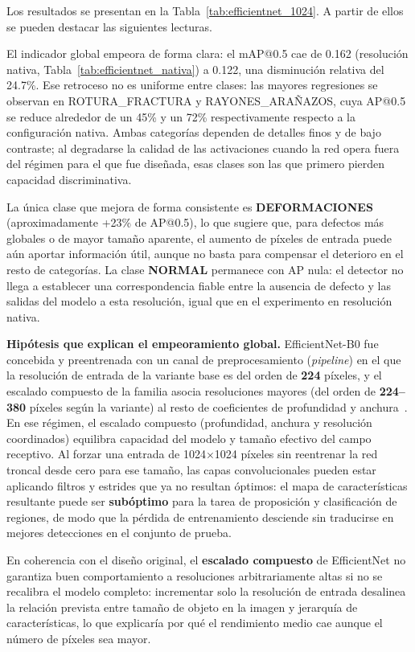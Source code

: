 Los resultados se presentan en la Tabla~\ref{tab:efficientnet_1024}. A partir de ellos se pueden destacar las siguientes lecturas.

El indicador global empeora de forma clara: el mAP@0.5 cae de 0.162 (resolución nativa, Tabla~\ref{tab:efficientnet_nativa}) a 0.122, una disminución relativa del 24.7\%. Ese retroceso no es uniforme entre clases: las mayores regresiones se observan en \mbox{ROTURA\_FRACTURA} y \mbox{RAYONES\_ARAÑAZOS}, cuya AP@0.5 se reduce alrededor de un 45\% y un 72\% respectivamente respecto a la configuración nativa. Ambas categorías dependen de detalles finos y de bajo contraste; al degradarse la calidad de las activaciones cuando la red opera fuera del régimen para el que fue diseñada, esas clases son las que primero pierden capacidad discriminativa.

La única clase que mejora de forma consistente es \textbf{DEFORMACIONES} (aproximadamente +23\% de AP@0.5), lo que sugiere que, para defectos más globales o de mayor tamaño aparente, el aumento de píxeles de entrada puede aún aportar información útil, aunque no basta para compensar el deterioro en el resto de categorías. La clase \textbf{NORMAL} permanece con AP nula: el detector no llega a establecer una correspondencia fiable entre la ausencia de defecto y las salidas del modelo a esta resolución, igual que en el experimento en resolución nativa.

\textbf{Hipótesis que explican el empeoramiento global.} EfficientNet-B0 fue concebida y preentrenada con un canal de preprocesamiento (\textit{pipeline}) en el que la resolución de entrada de la variante base es del orden de \textbf{224} píxeles, y el escalado compuesto de la familia asocia resoluciones mayores (del orden de \textbf{224--380} píxeles según la variante) al resto de coeficientes de profundidad y anchura~\cite{tan2019efficientnet}. En ese régimen, el escalado compuesto (profundidad, anchura y resolución coordinados) equilibra capacidad del modelo y tamaño efectivo del campo receptivo. Al forzar una entrada de 1024$\times$1024 píxeles sin reentrenar la red troncal desde cero para ese tamaño, las capas convolucionales pueden estar aplicando filtros y estrides que ya no resultan óptimos: el mapa de características resultante puede ser \textbf{subóptimo} para la tarea de proposición y clasificación de regiones, de modo que la pérdida de entrenamiento desciende sin traducirse en mejores detecciones en el conjunto de prueba.

En coherencia con el diseño original, el \textbf{escalado compuesto} de EfficientNet no garantiza buen comportamiento a resoluciones arbitrariamente altas si no se recalibra el modelo completo: incrementar solo la resolución de entrada desalinea la relación prevista entre tamaño de objeto en la imagen y jerarquía de características, lo que explicaría por qué el rendimiento medio cae aunque el número de píxeles sea mayor.

